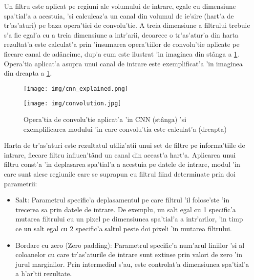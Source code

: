 \documentclass[12pt,a4paper,twoside]{report}
\begin{document}
Un filtru este aplicat pe regiuni ale volumului de intrare, egale cu dimensiune spa'tial'a a acestuia, 'si calculeaz'a un canal din volumul de ie'sire (hart'a de tr'as'aturi) pe baza opera'tiei de convolu'tie. A treia dimensiune a filtrului trebuie s'a fie egal'a cu a treia dimensiune a intr'arii, deoarece o tr'as'atur'a din harta rezultat'a este calculat'a prin 'insumarea opera'tiilor de convolu'tie aplicate pe fiecare canal de ad\^ancime, dup'a cum este ilustrat 'in imaginea din st\^anga  a \ref{fig:convolution}. Opera'tia aplicat'a asupra unui canal de intrare este exemplificat'a 'in imaginea din dreapta a \ref{fig:convolution}. 

\begin{figure}[H]
\centering
\begin{minipage}[b]{.5\textwidth}
  \centering
  \texttt{[image: img/cnn\_explained.png]}
\end{minipage}%
\begin{minipage}[b]{.5\textwidth}
  \texttt{[image: img/convolution.jpg]}
  \centering
\end{minipage}
\caption{Opera'tia de convolu'tie aplicat'a 'in CNN (st\^anga) 'si exemplificarea modului 'in care convolu'tia este calculat'a (dreapta) \protect\footnotemark}
\label{fig:convolution}
\end{figure}

Harta de tr'as'aturi este rezultatul utiliz'atii unui set de filtre pe informa'tiile de intrare, fiecare filtru influen't\^and un canal din aceast'a hart'a. Aplicarea unui filtru const'a 'in deplasarea spa'tial'a a acestuia pe datele de intrare, modul 'in care sunt alese regiunile care se suprapun cu filtrul fiind determinate prin doi parametrii:
\begin{itemize}
\item Salt: Parametrul specific'a deplasamentul pe care filtrul 'il folose'ste 'in trecerea sa prin datele de intrare. De exemplu, un salt egal cu 1 specific'a mutarea filtrului cu un pixel pe dimensiunea spa'tial'a a intr'arilor, 'in timp ce un salt egal cu 2 specific'a saltul peste doi pixeli 'in mutarea filtrului. 
\item Bordare cu zero (Zero padding): Parametrul specific'a num'arul liniilor 'si al coloanelor cu care tr'as'aturile de intrare sunt extinse prin valori de zero 'in jurul marginilor. Prin intermediul s'au, este controlat'a dimensiunea spa'tial'a a h'ar'tii rezultate.
\end{itemize}
\end{document}
